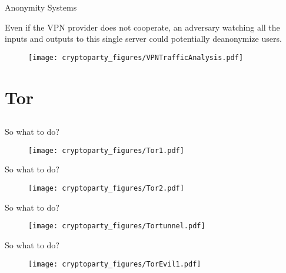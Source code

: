 \documentclass{beamer}
\begin{document}
\begin{frame}{Anonymity Systems}

Even if the VPN provider does not cooperate, an adversary watching all the inputs and outputs to this single server could potentially deanonymize users. \bigskip

\begin{figure}
\centering
\texttt{[image: cryptoparty\_figures/VPNTrafficAnalysis.pdf]}
\end{figure}

\end{frame}

\section{Tor}
\subsection{}

\begin{frame}{So what to do?}

\begin{figure}
\centering
\texttt{[image: cryptoparty\_figures/Tor1.pdf]}
\end{figure}

\end{frame}


\begin{frame}{So what to do?}

\begin{figure}
\centering
\texttt{[image: cryptoparty\_figures/Tor2.pdf]}
\end{figure}

\end{frame}

\begin{frame}{So what to do?}

\begin{figure}
\centering
\texttt{[image: cryptoparty\_figures/Tortunnel.pdf]}
\end{figure}

\end{frame}

\begin{frame}{So what to do?}

\begin{figure}
\centering
\texttt{[image: cryptoparty\_figures/TorEvil1.pdf]}
\end{figure}

\end{frame}
\end{document}
